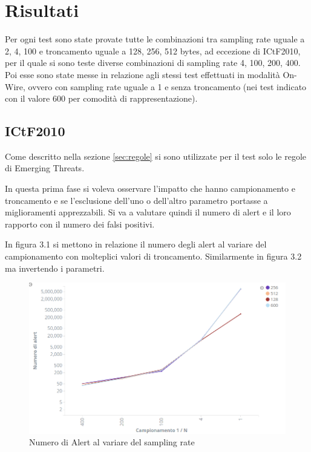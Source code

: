 \documentclass[12pt,a4paper,openright,twoside]{report}
\begin{document}
\section{Risultati}

Per ogni test sono state provate tutte le combinazioni tra sampling rate uguale a
2, 4, 100 e troncamento uguale a 128, 256, 512 bytes, ad eccezione di ICtF2010,
per il quale si sono teste diverse combinazioni di sampling rate 4, 100, 200, 400.
Poi esse sono state messe in relazione agli stessi test effettuati in modalit\`a On-Wire,
ovvero con sampling rate uguale a 1 e senza troncamento (nei test indicato con il valore 600 per comodit\`a di rappresentazione).
\subsection{ICtF2010}

Come descritto nella sezione \ref{sec:regole} si sono utilizzate per il test solo le
regole di Emerging Threats.

In questa prima fase si voleva osservare l'impatto che hanno campionamento e troncamento
e se l'esclusione dell'uno o dell'altro parametro portasse a miglioramenti apprezzabili.
Si va a valutare quindi il numero di alert e il loro rapporto con il numero dei
falsi positivi.

In figura 3.1 si mettono in relazione il numero degli alert al variare del campionamento
con molteplici valori di troncamento. Similarmente in figura 3.2 ma invertendo i
parametri.


\begin{figure}[h!]
\begin{center}                          %
  \includegraphics[width=\textwidth]{images/ICTF-samp-vs-trunc.png}
  \caption{Numero di Alert al variare del sampling rate}
  \label{}
\end{center}
\end{figure}
\end{document}
